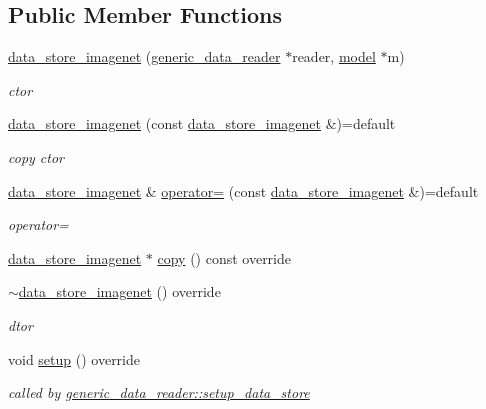 \subsection*{Public Member Functions}
\begin{DoxyCompactItemize}
\item 
\hyperlink{classlbann_1_1data__store__imagenet_a3040285850664ccecb4795df3c85fb8d}{data\+\_\+store\+\_\+imagenet} (\hyperlink{classlbann_1_1generic__data__reader}{generic\+\_\+data\+\_\+reader} $\ast$reader, \hyperlink{classlbann_1_1model}{model} $\ast$m)
\begin{DoxyCompactList}\small\item\em ctor \end{DoxyCompactList}\item 
\hyperlink{classlbann_1_1data__store__imagenet_abca3c81df8f4cd1c53f9b5b474da0481}{data\+\_\+store\+\_\+imagenet} (const \hyperlink{classlbann_1_1data__store__imagenet}{data\+\_\+store\+\_\+imagenet} \&)=default
\begin{DoxyCompactList}\small\item\em copy ctor \end{DoxyCompactList}\item 
\hyperlink{classlbann_1_1data__store__imagenet}{data\+\_\+store\+\_\+imagenet} \& \hyperlink{classlbann_1_1data__store__imagenet_a71b04726b0e651bc9b73cd6f5ca3c12b}{operator=} (const \hyperlink{classlbann_1_1data__store__imagenet}{data\+\_\+store\+\_\+imagenet} \&)=default
\begin{DoxyCompactList}\small\item\em operator= \end{DoxyCompactList}\item 
\hyperlink{classlbann_1_1data__store__imagenet}{data\+\_\+store\+\_\+imagenet} $\ast$ \hyperlink{classlbann_1_1data__store__imagenet_ae3b0d31ac020c36f41766999288e2d25}{copy} () const override
\item 
\hyperlink{classlbann_1_1data__store__imagenet_aa6f4479472b06cd7a8da399dd23b7487}{$\sim$data\+\_\+store\+\_\+imagenet} () override
\begin{DoxyCompactList}\small\item\em dtor \end{DoxyCompactList}\item 
void \hyperlink{classlbann_1_1data__store__imagenet_a611aa1734a491c443396a077b49fe4fe}{setup} () override
\begin{DoxyCompactList}\small\item\em called by \hyperlink{classlbann_1_1generic__data__reader_a8b2a09d38512fc11f1b9d572c89100a7}{generic\+\_\+data\+\_\+reader\+::setup\+\_\+data\+\_\+store} \end{DoxyCompactList}\end{DoxyCompactItemize}
